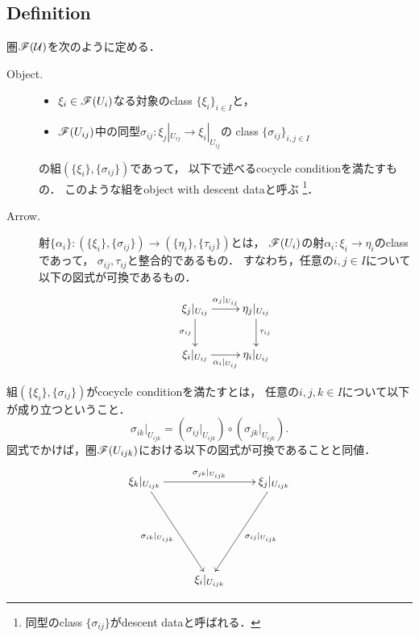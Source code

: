 \documentclass[a4paper, dvipdfmx]{jsarticle}
\begin{document}
\subsection{Definition}
\begin{Def}
    圏$\mathscr{F}(\mathcal{U})$を次のように定める．
    \begin{description}
        \item[Object.] \hfill \vspace{-0.2cm}
            \begin{itemize}
                \item $\xi_i \in \mathscr{F}(U_i)$なる対象のclass $\{\xi_i\}_{i \in I}$と，
                \item
                    $\mathscr{F}(U_{ij})$中の同型$\sigma_{ij} \colon \xi_j|_{U_{ij}} \to \xi_i|_{U_{ij}}$の
                    class $\{\sigma_{ij}\}_{i,j \in I}$
            \end{itemize}
            の組$(\{\xi_i\}, \{\sigma_{ij}\})$であって，
            以下で述べるcocycle conditionを満たすもの．
            このような組をobject with descent dataと呼ぶ
            \footnote{ 同型のclass $\{\sigma_{ij}\}$がdescent dataと呼ばれる． }．

        \item[Arrow.] \mnewline
            射$\{\alpha_i\} \colon (\{\xi_i\}, \{\sigma_{ij}\}) \to (\{\eta_i\}, \{\tau_{ij}\})$とは，
            $\mathscr{F}(U_i)$の射$\alpha_i \colon \xi_i \to \eta_i$のclassであって，\mnewline
            $\sigma_{ij}, \tau_{ij}$と整合的であるもの．
            すなわち，任意の$i, j \in I$について以下の図式が可換であるもの．
            \[\xymatrix{
                \ar[d]_-{\sigma_{ij}} \xi_j|_{U_{ij}} \ar[r]^-{\alpha_j|_{U_{ij}}}&
                \eta_j|_{U_{ij}} \ar[d]^-{\tau_{ij}}\\
                 \xi_i|_{U_{ij}} \ar[r]_-{\alpha_i|_{U_{ij}}}& \eta_i|_{U_{ij}}
            }\]
    \end{description}

    組$(\{\xi_i\}, \{\sigma_{ij}\})$がcocycle conditionを満たすとは，
    任意の$i,j,k \in I$について以下が成り立つということ．
    \[ \sigma_{ik}|_{U_{ijk}}=(\sigma_{ij}|_{U_{ijk}}) \circ (\sigma_{jk}|_{U_{ijk}}). \]
    図式でかけば，圏$\mathscr{F}(U_{ijk})$における以下の図式が可換であることと同値．
    \[\xymatrix@R=70pt{
         \xi_k|_{U_{ijk}} \ar[rd]_-{\sigma_{ik}|_{U_{ijk}}} \ar[rr]^-{\sigma_{jk}|_{U_{ijk}}}
            & {}
            & \xi_j|_{U_{ijk}} \ar[ld]^-{\sigma_{ij}|_{U_{ijk}}} \\
        {} & \xi_i|_{U_{ijk}} & {}
    }\]
\end{Def}
\end{document}
